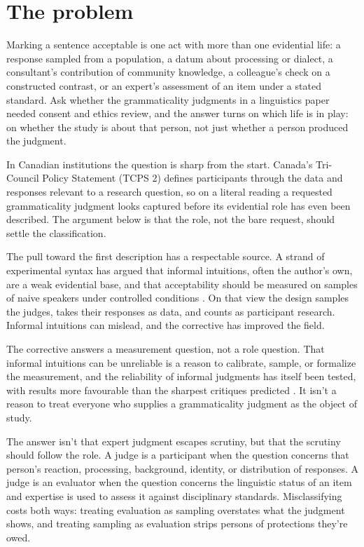 \section{The problem}
\label{sec:problem}

Marking a sentence acceptable is one act with more than one evidential life: a response sampled from a population, a datum about processing or dialect, a consultant's contribution of community knowledge, a colleague's check on a constructed contrast, or an expert's assessment of an item under a stated standard. Ask whether the grammaticality judgments in a linguistics paper needed consent and ethics review, and the answer turns on which life is in play: on whether the study is about that person, not just whether a person produced the judgment.

In Canadian institutions the question is sharp from the start. Canada's Tri-Council Policy Statement (TCPS 2) defines participants through the data and responses relevant to a research question, so on a literal reading a requested grammaticality judgment looks captured before its evidential role has even been described. The argument below is that the role, not the bare request, should settle the classification.

The pull toward the first description has a respectable source. A strand of experimental syntax has argued that informal intuitions, often the author's own, are a weak evidential base, and that acceptability should be measured on samples of naive speakers under controlled conditions \citep{gibsonfedorenko2010,gibsonfedorenko2013,gibson2011mturk}. On that view the design samples the judges, takes their responses as data, and counts as participant research. Informal intuitions can mislead, and the corrective has improved the field.

The corrective answers a measurement question, not a role question. That informal intuitions can be unreliable is a reason to calibrate, sample, or formalize the measurement, and the reliability of informal judgments has itself been tested, with results more favourable than the sharpest critiques predicted \citep{sprouse2013,schutze2016}. It isn't a reason to treat everyone who supplies a grammaticality judgment as the object of study.

The answer isn't that expert judgment escapes scrutiny, but that the scrutiny should follow the role. A judge is a participant when the question concerns that person's reaction, processing, background, identity, or distribution of responses. A judge is an evaluator when the question concerns the linguistic status of an item and expertise is used to assess it against disciplinary standards. Misclassifying costs both ways: treating evaluation as sampling overstates what the judgment shows, and treating sampling as evaluation strips persons of protections they're owed.

